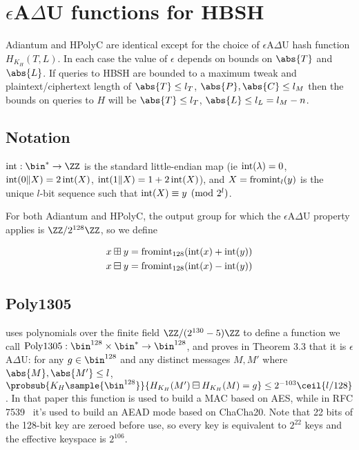 \documentclass[eprint.tex]{subfiles}
\begin{document}
\section{\texorpdfstring{$\epsilon$A$\Delta$U}{𝜖A∆U} functions for HBSH}\label{hashing}

Adiantum and HPolyC are identical except for the choice of $\epsilon$A$\Delta$U hash function
$H_{K_H}(T, L)$. In each case the value of $\epsilon$ depends on bounds on $\abs{T}$ and $\abs{L}$.
If queries to HBSH are bounded to a maximum tweak and plaintext/ciphertext length of
$\abs{T} \leq l_T$, $\abs{P}, \abs{C} \leq l_M$
then the bounds on queries to $H$ will be $\abs{T} \leq l_T$, $\abs{L} \leq l_L = l_M - n$.

\subsection{Notation}

$\intify: \bin^{*} \rightarrow \ZZ$ is the
standard little-endian map
(ie $\operatorname{int}(\lambda) = 0$, $\operatorname{int}(0 \Vert X) = 2\operatorname{int}(X)$, $\operatorname{int}(1 \Vert X) = 1 + 2\operatorname{int}(X)$),
and $X = \operatorname{fromint}_l(y)$ is the unique
$l$-bit sequence such that $\operatorname{int}(X) \equiv y \pmod{2^l}$.

For both Adiantum and HPolyC,
the output group for which the $\epsilon$A$\Delta$U property applies is
$\ZZ/2^{128}\ZZ$, so we define

\begin{align*}
    x \boxplus y &= \operatorname{fromint}_{128}(\operatorname{int}(x) + \operatorname{int}(y)) \\
    x \boxminus y &= \operatorname{fromint}_{128}(\operatorname{int}(x) - \operatorname{int}(y)) \\
\end{align*}

\subsection{Poly1305}

\cite{poly1305} uses polynomials over the finite field $\ZZ/(2^{130}-5)\ZZ$
to define a function we call
$\Polydjb: \bin^{128} \times \bin^* \rightarrow \bin^{128}$,
and proves in Theorem 3.3 that it is $\epsilon$A$\Delta$U: for any
$g \in \bin^{128}$ and any distinct messages $M, M'$ where $\abs{M}, \abs{M'} \leq l$,
$\probsub{K_H \sample{\bin^{128}}}{H_{K_H}(M') \boxminus H_{K_H}(M) = g} \leq 2^{-103}\ceil{l/128}$.
In that paper this function is used to build a MAC based on AES, while in
RFC 7539~\cite{RFC7539} it's used to build an AEAD mode based on ChaCha20.
Note that 22 bits of the 128-bit key are zeroed before use, so every key is equivalent to
$2^{22}$ keys and the effective keyspace is $2^{106}$.
\end{document}
